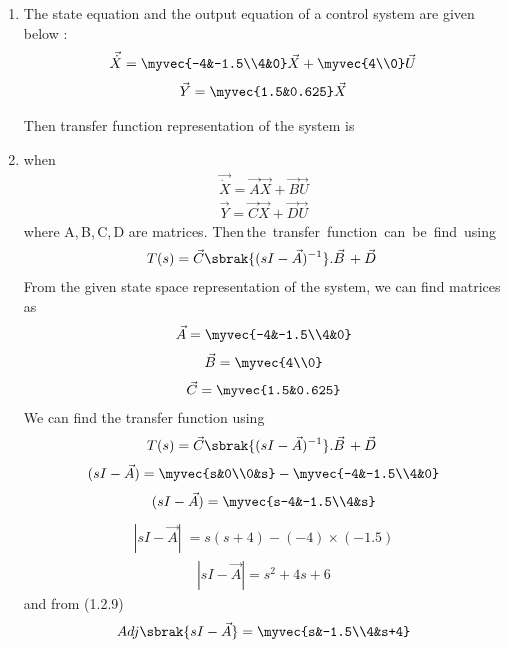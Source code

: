 \begin{enumerate}[label=\thesection.\arabic*.,ref=\thesection.\theenumi]

\item
The state equation and the output equation of a control system are given below : 
\begin{align}
    \vec{\dot X}=\myvec{-4&-1.5\\4&0}\vec{X} + \myvec{4\\0}\vec{U}   
\end{align}
\begin{align}
    \vec{Y} = \myvec{1.5&0.625}\vec{X}
\end{align}
  
Then transfer function representation of the system is 


\item 
\solution
when
\begin{align}
    \vec{\dot{X}} = \vec{A}\vec{X} + \vec{B}\vec{U}
\end{align}
\begin{align}
    \vec{Y} = \vec{C}\vec{X} + \vec{D}\vec{U}
\end{align}
\vskip 0.1cm
where \; A,\,B,\,C,\,D \; are matrices.
  Then\,the\, transfer\, function\, can\, be\, find\, using
\vskip 0.1cm
\begin{align}
    T(s) = \vec{C}\sbrak{(sI-\vec{A})^{-1}}.\vec{B} \,+ \vec{D}\
\end{align}
\vskip 0.1cm
From the given state space representation of the system, we can find matrices as
\begin{align}
    \vec{A}= \myvec{-4&-1.5\\4&0}
\end{align}
\begin{align}
    \vec{B} = \myvec{4\\0}
\end{align}
\begin{align}
     \vec{C} = \myvec{1.5&0.625}
\end{align}
We can find the transfer function using
\begin{align}
    T(s) = \vec{C}\sbrak{(sI-\vec{A})^{-1}}.\vec{B} \,+ \vec{D}\
\end{align}
\begin{align}
    (sI - \vec{A}) =  \myvec{s&0\\0&s} -  \myvec{-4&-1.5\\4&0}
\end{align}
\begin{align}
    (sI - \vec{A}) =  \myvec{s-4&-1.5\\4&s}
\end{align}
\begin{align}
    |sI - \vec{A}| \; = s(s+4) - (-4)\times (-1.5)
\end{align}
\vskip 0.1cm
\begin{align}
    |sI - \vec{A}| = s^2 + 4s+ 6
\end{align}
\vskip 0.1cm
and from (1.2.9)
\begin{align}
    Adj\sbrak{sI - \vec{A}} =  \myvec{s&-1.5\\4&s+4}
\end{align}


\end{enumerate}
